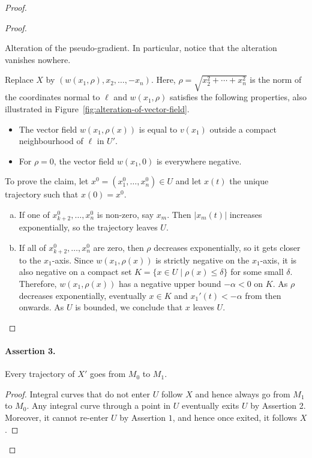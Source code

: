 \begin{proof}
\begin{proof}
    \begin{marginfigure}
        \centering
        \caption{Alteration of the pseudo-gradient. In particular, notice that the alteration vanishes nowhere.}
        \label{fig:alteration-of-vector-field}
    \end{marginfigure}
    Replace $X$ by  $(w(x_1, \rho), x_2, \ldots, -x_n)$.
    Here, $\rho = \sqrt{x_2^2 + \cdots + x_n^2}$ is the norm of the coordinates normal to $\ell$ and $w(x_1, \rho)$ satisfies the following properties, also illustrated in Figure~\ref{fig:alteration-of-vector-field}.
    \begin{itemize}
        \item The vector field $w(x_1, \rho(x))$ is equal to $v(x_1)$ outside a compact neighbourhood of  $ \ell$ in $U'$.
        \item For $\rho = 0$, the vector field $w(x_1, 0)$ is everywhere negative.
    \end{itemize}
    To prove the claim, let $x^0 = (x_1^{0}, \ldots, x_n^{0}) \in U$ and let $x(t)$ the unique trajectory such that  $x(0) = x^{0}$.
    \begin{enumerate}[(a)]
        \item If one of $x_{k+2}^{0}, \ldots, x_n^{0}$ is non-zero, say $x_m$. Then $|x_m(t)|$ increases exponentially, so the trajectory leaves $U$.
        \item If all of $x_{k+2}^{0}, \ldots, x_n^{0}$ are zero, then $\rho$ decreases exponentially, so it gets closer to the $x_1$-axis.
            Since $w(x_1, \rho(x))$ is strictly negative on the $ x_1$-axis, it is also negative on a compact set $K = \{ x \in U  \mid  \rho(x) \le  \delta\} $ for some small $\delta$.
            Therefore, $ w(x_1, \rho(x))$ has a negative upper bound $-\alpha < 0$ on $K$.
            As $\rho$ decreases exponentially, eventually  $x \in K$ and $x_1'(t) < -\alpha$ from then onwards.
            As $U$ is bounded, we conclude that $x$ leaves $U$. \qedhere
    \end{enumerate}
\end{proof}
\paragraph{Assertion 3.}
Every trajectory of $X'$ goes from $M_0$ to $M_1$.
\begin{proof}
    Integral curves that do not enter $U$ follow $X$ and hence always go from  $M_1$ to $M_0$.
    Any integral curve through a point in $U$ eventually exits $U$ by Assertion 2. Moreover, it cannot re-enter $U$ by Assertion $1$, and hence once exited, it follows $X$.
\end{proof}


\end{proof}
